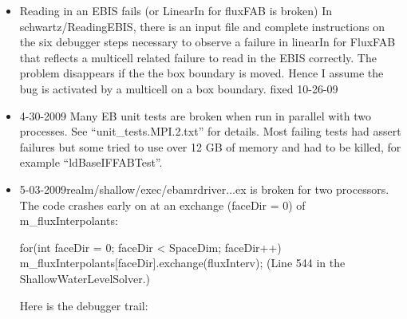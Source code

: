 \begin{itemize}
\item {Reading in an EBIS fails (or LinearIn for fluxFAB is broken)}
In schwartz/ReadingEBIS,  there is an input file and complete
instructions on the six debugger steps necessary to observe a failure
in linearIn for FluxFAB that reflects a multicell related failure to
read in the EBIS correctly. The problem disappears if the the box
boundary is moved. Hence I assume the bug is activated by a multicell
on a box boundary.   fixed 10-26-09

\item{4-30-2009}  Many EB unit tests are broken when run in parallel
  with two processes.  See ``unit_tests.MPI.2.txt'' for details.  Most
  failing tests had assert failures but some tried to use over 12 GB of
  memory and had to be killed, for example ``ldBaseIFFABTest''.


\item {5-03-2009}realm/shallow/exec/ebamrdriver...ex is broken for two processors. The code crashes early on at an exchange (faceDir = 0) of m_fluxInterpolants:

 for(int faceDir = 0; faceDir < SpaceDim; faceDir++)
    {
      m_fluxInterpolants[faceDir].exchange(fluxInterv);
    }
(Line 544 in the ShallowWaterLevelSolver.)

 Here is the debugger trail:


\end{itemize}
